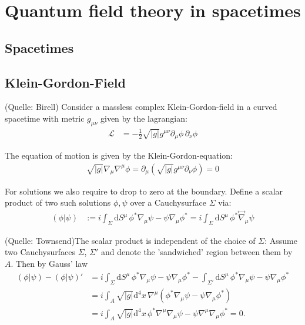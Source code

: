 \chapter{Quantum field theory in spacetimes}
\section{Spacetimes}

\section{Klein-Gordon-Field}
(Quelle: Birell)
Consider a massless complex Klein-Gordon-field in a curved spacetime with metric \(g_{\mu\nu}\) given by the lagrangian:
\begin{align}
\mathcal{L} &= -\frac{1}{2}\sqrt{|g|} g^{\mu\nu} \partial_\mu \phi\,\partial_\nu \phi 
\end{align}

The equation of motion is given by the Klein-Gordon-equation:
\begin{align}
\sqrt{|g|}\nabla_\mu\nabla^\mu \phi = \partial_\mu \left(\sqrt{|g|} g^{\mu\nu} \partial_\nu \phi\right) = 0
\end{align}

For solutions we also require to drop to zero at the boundary. Define a scalar product of two such solutions $\phi, \psi$ over a Cauchysurface \(\Sigma\) via:
\begin{align}
(\phi|\psi) &:= i \int_{\Sigma} \mathrm{d}S^\mu\, \phi^*\nabla_\mu \psi - \psi\nabla_\mu \phi^* = i \int_{\Sigma} \mathrm{d}S^\mu\, \phi^*\overset{\leftrightarrow}{\nabla}_\mu \psi
\end{align}

(Quelle: Townsend)The scalar product is independent of the choice of \(\Sigma\): Assume two Cauchysurfaces \(\Sigma\), \(\Sigma'\) and denote the 'sandwiched' region between them by \(A\). Then by Gauss' law
\begin{align}
(\phi|\psi) - (\phi|\psi)' &= i\int_{\Sigma}\mathrm{d}S^\mu\, \phi^*\nabla_\mu \psi - \psi\nabla_\mu \phi^* - \int_{\Sigma'}\mathrm{d}S^\mu\, \phi^*\nabla_\mu \psi - \psi\nabla_\mu \phi^*\\
	&= i\int_{A} \sqrt{|g|} \mathrm{d^4}x\,\nabla^\mu \left(\phi^*\nabla_\mu \psi - \psi\nabla_\mu \phi^*\right)\\
	&= i\int_{A} \sqrt{|g|} \mathrm{d^4}x\,\phi^*\nabla^\mu\nabla_\mu \psi - \psi \nabla^\mu\nabla_\mu\phi^* = 0.
\label{equ:qft_scalarproduct_invariant}
\end{align}

